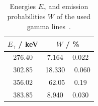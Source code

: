 \begin{table}[H]
	\centering
	\caption{Energies $E_\gamma$ and emission probabilities $W$ of the used  gamma lines~\cite{ba133}.}
	\label{tab:ba_lit}
	\begin{tabular}{c  c}
		\toprule
		$E_\gamma$ / keV & $W$ / \%\\
		\midrule
		276.40 & 7.164  \, \clap{$\pm$} \,  0.022 \\
		 302.85 & 18.330  \, \clap{$\pm$} \,  0.060 \\
		 356.02 & 62.05  \, \clap{$\pm$} \,  0.19 \\
		 383.85 & 8.940  \, \clap{$\pm$} \,  0.030 \\
		 \bottomrule
	\end{tabular}
\end{table}
